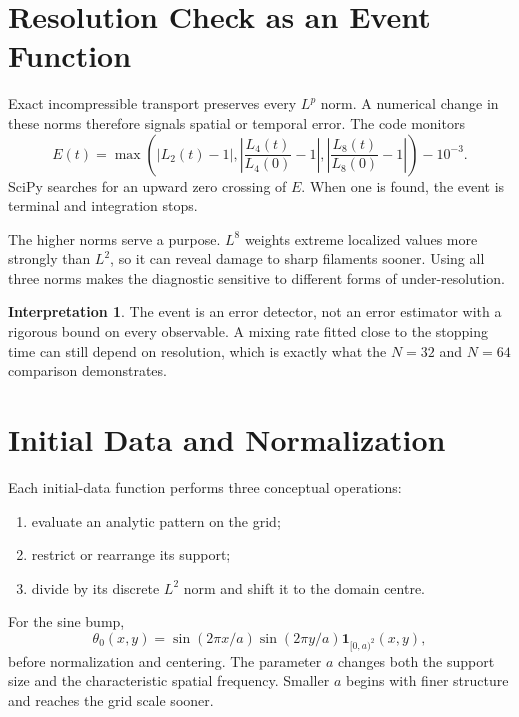 \documentclass[12pt,a4paper]{article}
\theoremstyle{definition}
\newtheorem{remark}{Interpretation}[section]
\begin{document}
\section{Resolution Check as an Event Function}

Exact incompressible transport preserves every $L^p$ norm. A numerical
change in these norms therefore signals spatial or temporal error. The code
monitors
\begin{equation}
  E(t)=\max\left(
  |L_2(t)-1|,
  \left|\frac{L_4(t)}{L_4(0)}-1\right|,
  \left|\frac{L_8(t)}{L_8(0)}-1\right|
  \right)-10^{-3}.
  \label{eq:event}
\end{equation}
SciPy searches for an upward zero crossing of $E$. When one is found, the
event is terminal and integration stops.

The higher norms serve a purpose. $L^8$ weights extreme localized values
more strongly than $L^2$, so it can reveal damage to sharp filaments sooner.
Using all three norms makes the diagnostic sensitive to different forms of
under-resolution.

\begin{remark}
The event is an error detector, not an error estimator with a rigorous bound
on every observable. A mixing rate fitted close to the stopping time can
still depend on resolution, which is exactly what the $N=32$ and $N=64$
comparison demonstrates.
\end{remark}

\section{Initial Data and Normalization}

Each initial-data function performs three conceptual operations:
\begin{enumerate}
  \item evaluate an analytic pattern on the grid;
  \item restrict or rearrange its support;
  \item divide by its discrete $L^2$ norm and shift it to the domain centre.
\end{enumerate}
For the sine bump,
\begin{equation}
  \theta_0(x,y)=
  \sin(2\pi x/a)\sin(2\pi y/a)
  \mathbf{1}_{[0,a)^2}(x,y),
\end{equation}
before normalization and centering. The parameter $a$ changes both the
support size and the characteristic spatial frequency. Smaller $a$ begins
with finer structure and reaches the grid scale sooner.
\end{document}
